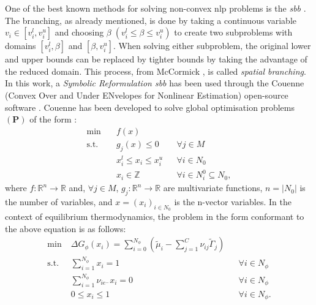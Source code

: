 One of the best known methods for solving non-convex \gls{nlp} problems is the \emph{\gls{sbb}} \cite{Smith:1996aa,Tawarmalani:2013aa}. The branching, as already mentioned, is done by taking a continuous variable $v_i \in \left[v_i^l , v_i^u \right]$ and choosing $\beta \; (v_i^l \leq \beta \leq v_i^u)$ to create two subproblems with domains $\left[v_i^l , \beta \right]$ and $\left[\beta , v_i^u \right]$. When solving either subproblem, the original lower and upper bounds can be replaced by tighter bounds by taking the advantage of the reduced domain. This process, from McCormick \cite{McCormick:1976aa}, is called \emph{spatial branching}.
In this work, a \emph{Symbolic Reformulation \gls{sbb}} \cite{Smith:1996aa,Smith:1997ab,Smith:1999aa} has been used through the Couenne (Convex Over and Under ENvelopes for Nonlinear Estimation) open-source software \cite{Belotti:2009aa,Belotti:2022aa}. Couenne has been developed to solve global optimisation problems $(\mathbf{P})$  of the form \cite{Belotti:2009aa}:
\begin{equation} \label{eq:couenne_prob}
\begin{aligned}
	\min \quad &f(x)			& \\
	\text{s.t.} \quad &g_j(x) \leq 0  	& &\forall j \in M \\
	&x_i^l \leq x_i \leq x_i^u	& &\forall i \in N_0 \\
	& x_i \in \mathbb{Z}		& &\forall i \in N_i^0 \subseteq N_0,
\end{aligned}
\end{equation}
where $f : \mathbb{R}^n \rightarrow \mathbb{R}$ and, $\forall j \in M$, $g_j : \mathbb{R}^n \rightarrow \mathbb{R}$ are multivariate functions, $n = \left|N_0\right|$ is the number of variables, and $x = (x_i)_{i \in N_0}$ is the n-vector variables. In the context of equilibrium thermodynamics, the problem in the form conformant to the above equation is as follows:
\begin{equation}
\begin{aligned}
	\min \; & \Delta G_\phi(x_i) = \sum_{i=0}^{N_\phi} \left( \tilde{\mu}_i - \sum_{j=1}^{C} \nu_{ij}\tilde{\Gamma}_j \right)		& \\
	\text{s.t.} \; &\sum_{i=1}^{N_\phi} x_i = 1  	& &\forall i \in N_\phi \\
			&\sum_{i=1}^{N_\phi} \nu_{i{e^-}} x_i = 0 & &\forall i \in N_\phi \\
	&0 \leq x_i \leq 1	& & \forall i \in N_\phi.
\end{aligned}
\end{equation}
